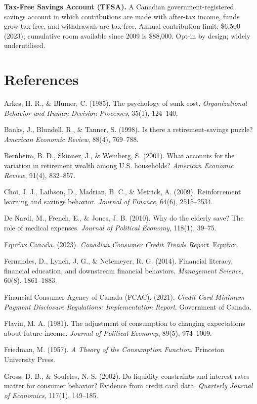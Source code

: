 \documentclass[12pt, letterpaper]{article}
\begin{document}
\textbf{Tax-Free Savings Account (TFSA).} A Canadian government-registered savings account in which contributions are made with after-tax income, funds grow tax-free, and withdrawals are tax-free. Annual contribution limit: \$6,500 (2023); cumulative room available since 2009 is \$88,000. Opt-in by design; widely underutilised.

\medskip


\section*{References}


Arkes, H. R., \& Blumer, C. (1985). The psychology of sunk cost. \textit{Organizational Behavior and Human Decision Processes}, 35(1), 124--140.

Banks, J., Blundell, R., \& Tanner, S. (1998). Is there a retirement-savings puzzle? \textit{American Economic Review}, 88(4), 769--788.

Bernheim, B. D., Skinner, J., \& Weinberg, S. (2001). What accounts for the variation in retirement wealth among U.S. households? \textit{American Economic Review}, 91(4), 832--857.

Choi, J. J., Laibson, D., Madrian, B. C., \& Metrick, A. (2009). Reinforcement learning and savings behavior. \textit{Journal of Finance}, 64(6), 2515--2534.

De Nardi, M., French, E., \& Jones, J. B. (2010). Why do the elderly save? The role of medical expenses. \textit{Journal of Political Economy}, 118(1), 39--75.

Equifax Canada. (2023). \textit{Canadian Consumer Credit Trends Report}. Equifax.

Fernandes, D., Lynch, J. G., \& Netemeyer, R. G. (2014). Financial literacy, financial education, and downstream financial behaviors. \textit{Management Science}, 60(8), 1861--1883.

Financial Consumer Agency of Canada (FCAC). (2021). \textit{Credit Card Minimum Payment Disclosure Regulations: Implementation Report}. Government of Canada.

Flavin, M. A. (1981). The adjustment of consumption to changing expectations about future income. \textit{Journal of Political Economy}, 89(5), 974--1009.

Friedman, M. (1957). \textit{A Theory of the Consumption Function}. Princeton University Press.

Gross, D. B., \& Souleles, N. S. (2002). Do liquidity constraints and interest rates matter for consumer behavior? Evidence from credit card data. \textit{Quarterly Journal of Economics}, 117(1), 149--185.
\end{document}
